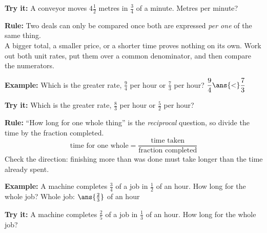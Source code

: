 \documentclass[12pt]{article}
\begin{document}
\begin{tryitbox}
\textbf{Try it:} \quad A conveyor moves $4\frac{1}{2}$ metres in $\frac{3}{4}$ of a minute. Metres per minute?\\[2pt]
\end{tryitbox}


\begin{formulabox}
\textbf{Rule:} Two deals can only be compared once both are expressed \emph{per one} of the same thing.\\[3pt]
A bigger total, a smaller price, or a shorter time proves nothing on its own. Work out both unit rates, put them over a common denominator, and then compare the numerators.
\end{formulabox}

\begin{examplebox}
\textbf{Example:} \quad Which is the greater rate, $\frac{9}{4}$ per hour or $\frac{7}{3}$ per hour?
$\dfrac{9}{4} \ans{<} \dfrac{7}{3}$
\end{examplebox}

\begin{tryitbox}
\textbf{Try it:} \quad Which is the greater rate, $\frac{8}{3}$ per hour or $\frac{5}{2}$ per hour?\\[2pt]
\end{tryitbox}


\begin{formulabox}
\textbf{Rule:} ``How long for one whole thing'' is the \emph{reciprocal} question, so divide the time by the fraction completed.
\[ \text{time for one whole} = \frac{\text{time taken}}{\text{fraction completed}} \]
Check the direction: finishing more than was done must take longer than the time already spent.
\end{formulabox}

\begin{examplebox}
\textbf{Example:} \quad A machine completes $\frac{3}{4}$ of a job in $\frac{1}{2}$ of an hour. How long for the whole job?
Whole job: $\ans{\tfrac{2}{3}}$ of an hour
\end{examplebox}

\begin{tryitbox}
\textbf{Try it:} \quad A machine completes $\frac{2}{5}$ of a job in $\frac{1}{3}$ of an hour. How long for the whole job?\\[2pt]
\end{tryitbox}
\end{document}
